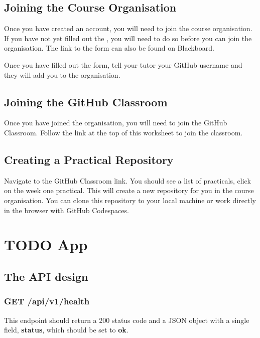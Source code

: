 \documentclass{csse4400}
\begin{document}
\subsection{Joining the Course Organisation}
Once you have created an account, you will need to join the course organisation.
If you have not yet filled out the ,%
you will need to do so before you can join the organisation.
The link to the form can also be found on Blackboard.

Once you have filled out the form,
tell your tutor your GitHub username and they will add you to the organisation.

\subsection{Joining the GitHub Classroom}
Once you have joined the organisation,
you will need to join the GitHub Classroom.
Follow the link at the top of this worksheet to join the classroom.

\subsection{Creating a Practical Repository}
Navigate to the GitHub Classroom link.
You should see a list of practicals, click on the week one practical.
This will create a new repository for you in the course organisation.
You can clone this repository to your local machine or work directly in the browser with GitHub Codespaces.



\section{TODO App}

\subsection{The API design}

\subsubsection{GET /api/v1/health}
This endpoint should return a 200 status code and a JSON object with a single field, \textbf{status}, which should be set to \textbf{ok}.
\end{document}
